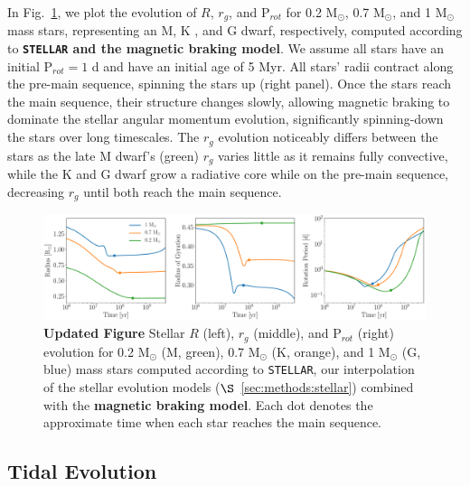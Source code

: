\documentclass[twocolumn]{aastex61}
\newcommand{\xxx}[1]{{\textbf{#1}}}
\newcommand{\stellar}[0]{\texttt{STELLAR}\xspace}
\begin{document}
In Fig.~\ref{fig:stellarExample}, we plot the evolution of $R$, $r_g$, and P$_{rot}$ for 0.2 M$_{\odot}$, 0.7 M$_{\odot}$, and 1 M$_{\odot}$ mass stars, representing an M, K , and G dwarf, respectively, computed according to \xxx{\stellar and the \citet{Matt2015} magnetic braking model}. We assume all stars have an initial P$_{rot} = 1$ d and have an initial age of 5 Myr. All stars' radii contract along the pre-main sequence, spinning the stars up (right panel). Once the stars reach the main sequence, their structure changes slowly, allowing magnetic braking to dominate the stellar angular momentum evolution, significantly spinning-down the stars over long timescales. The $r_g$ evolution noticeably differs between the stars as the late M dwarf's (green) $r_g$ varies little as it remains fully convective, while the K and G dwarf grow a radiative core while on the pre-main sequence, decreasing $r_g$ until both reach the main sequence.


\begin{figure}[ht]
	\includegraphics[width=\textwidth]{../Plots/stellarExample.pdf}
   \caption{\xxx{Updated Figure} Stellar $R$ (left), $r_g$ (middle), and P$_{rot}$ (right) evolution for 0.2 M$_{\odot}$ (M, green), 0.7 M$_{\odot}$ (K, orange), and 1 M$_{\odot}$ (G, blue) mass stars computed according to \stellar, our interpolation of the \citet{Baraffe2015} stellar evolution models ($\S$~\ref{sec:methods:stellar}) combined with the \xxx{\citet{Matt2015} magnetic braking model}. Each dot denotes the approximate time when each star reaches the main sequence.}%
    \label{fig:stellarExample}%
\end{figure}

\subsection{Tidal Evolution} \label{sec:methods:eqtide}
\end{document}
